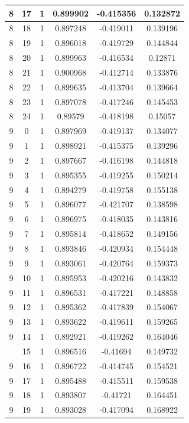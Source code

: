 \documentclass[12pt,a4paper]{article}
\numberwithin{equation}{section}
\numberwithin{figure}{section}
\numberwithin{table}{section}
\begin{document}
\begin{longtable}{|c|c|c|c|c|c|}
8 & 17 & 1 & 0.899902 & -0.415356 & 0.132872 \\ \hline
8 & 18 & 1 & 0.897248 & -0.419011 & 0.139196 \\ \hline
8 & 19 & 1 & 0.896018 & -0.419729 & 0.144844 \\ \hline
8 & 20 & 1 & 0.899963 & -0.416534 & 0.12871 \\ \hline
8 & 21 & 1 & 0.900968 & -0.412714 & 0.133876 \\ \hline
8 & 22 & 1 & 0.899635 & -0.413704 & 0.139664 \\ \hline
8 & 23 & 1 & 0.897078 & -0.417246 & 0.145453 \\ \hline
8 & 24 & 1 & 0.89579 & -0.418198 & 0.15057 \\ \hline
9 & 0 & 1 & 0.897969 & -0.419137 & 0.134077 \\ \hline
9 & 1 & 1 & 0.898921 & -0.415375 & 0.139296 \\ \hline
9 & 2 & 1 & 0.897667 & -0.416198 & 0.144818 \\ \hline
9 & 3 & 1 & 0.895355 & -0.419255 & 0.150214 \\ \hline
9 & 4 & 1 & 0.894279 & -0.419758 & 0.155138 \\ \hline
9 & 5 & 1 & 0.896077 & -0.421707 & 0.138598 \\ \hline
9 & 6 & 1 & 0.896975 & -0.418035 & 0.143816 \\ \hline
9 & 7 & 1 & 0.895814 & -0.418652 & 0.149156 \\ \hline
9 & 8 & 1 & 0.893846 & -0.420934 & 0.154448 \\ \hline
9 & 9 & 1 & 0.893061 & -0.420764 & 0.159373 \\ \hline
9 & 10 & 1 & 0.895953 & -0.420216 & 0.143832 \\ \hline
9 & 11 & 1 & 0.896531 & -0.417221 & 0.148858 \\ \hline
9 & 12 & 1 & 0.895362 & -0.417839 & 0.154067 \\ \hline
9 & 13 & 1 & 0.893622 & -0.419611 & 0.159265 \\ \hline
9 & 14 & 1 & 0.892921 & -0.419262 & 0.164046 \\ \hline
\pagebreak
9 & 15 & 1 & 0.896516 & -0.41694 & 0.149732 \\ \hline
9 & 16 & 1 & 0.896722 & -0.414745 & 0.154521 \\ \hline
9 & 17 & 1 & 0.895488 & -0.415511 & 0.159538 \\ \hline
9 & 18 & 1 & 0.893807 & -0.41721 & 0.164451 \\ \hline
9 & 19 & 1 & 0.893028 & -0.417094 & 0.168922 \\ \hline

\end{longtable}
\end{document}
